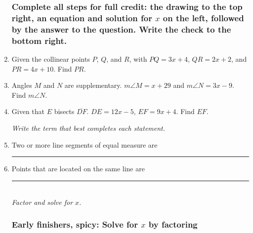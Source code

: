 \documentclass[12pt, twoside]{article}
\begin{document}
\begin{enumerate}
\newpage
\subsubsection*{Complete all steps for full credit: the drawing to the top right, an equation and solution for $x$ on the left, followed by the answer to the question. Write the check to the bottom right.}

  \item Given the collinear points $P$, $Q$, and $R$, with $PQ=3x+4$, $QR=2x+2$, and $PR=4x+10$. Find ${PR}$.
  \vspace{9cm}

  \item Angles $M$ and $N$ are supplementary. $m\angle M = x+29$ and $m\angle N = 3x-9$. Find $m\angle N$. \vspace{7cm}


\newpage

  \item Given that $E$ bisects $\overline{DF}$. $DE=12x-5$, $EF=9x+4$. Find ${EF}$.
  \vspace{9cm}

  \emph{Write the term that best completes each statement.}
  \item Two or more line segments of equal measure are \rule{4cm}{0.15mm} \bigskip

  \item Points that are located on the same line are \rule{4cm}{0.15mm} \\[15pt]

  \emph{Factor and solve for $x$.}
  
\newpage

  \subsubsection*{Early finishers, spicy: Solve for $x$ by factoring}



  \end{enumerate}
\end{document}
